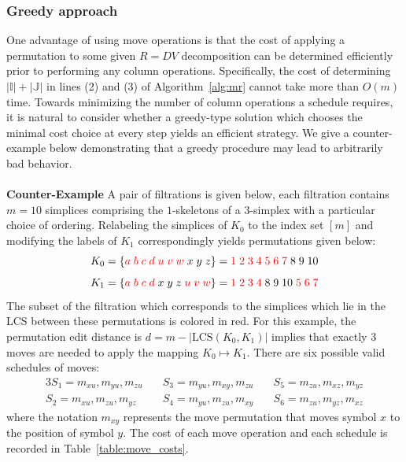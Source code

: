 \documentclass{article} %
\begin{document}
\subsubsection{Greedy approach}\label{sec:greedy} 
One advantage of using move operations is that the cost of applying a permutation to some given $R = D V$ decomposition can be determined efficiently prior to performing any column operations. 
Specifically, the cost of determining $\lvert \mathbb{I}\rvert + \lvert \mathbb{J}\rvert$ in lines (2) and (3) of Algorithm~\ref{alg:mr} cannot take more than $O(m)$ time. 
Towards minimizing the number of column operations a schedule requires, it is natural to consider whether a greedy-type solution which chooses the minimal cost choice at every step yields an efficient strategy. We give a counter-example below demonstrating that a greedy procedure may lead to arbitrarily bad behavior. 
\\
\\
\textbf{Counter-Example} A pair of filtrations is given below, each filtration contains $m = 10$ simplices comprising the $1$-skeletons of a $3$-simplex with a particular choice of ordering. Relabeling the simplices of $K_0$ to the index set $[m]$ and modifying the labels of $K_1$ correspondingly yields permutations given below: 
$$ K_0 = \{ {\color{red} a \; b \; c \; d \; u \; v \; w} \; x \; y \; z  \} = { {\color{red} 1 \; 2 \; 3 \; 4 \; 5 \; 6 \; 7 } \; 8 \; 9 \; 10 } $$
$$ K_1 = \{ {\color{red} a \; b \; c \; d } \; x \; y \; z \; {\color{red} u \; v \; w } \}  = { {\color{red} 1 \; 2 \; 3 \; 4 } \;8 \; 9 \; 10 \; {\color{red} 5 \; 6 \; 7 } }$$
The subset of the filtration which corresponds to the simplices which lie in the LCS between these permutations is colored in red. For this example, the permutation edit distance is 
$d = m - |\mathrm{LCS}(K_0, K_1)|$ implies that exactly $3$ moves are needed to apply the mapping $K_0 \mapsto K_1$. There are six possible valid schedules of moves: 
\begin{alignat*}{3}
	S_1 = m_{x u}, m_{y u}, m_{z u} \quad & S_3 = m_{y u}, m_{x y}, m_{z u} \quad  & S_5 = m_{z u}, m_{x z}, m_{y z} \\
	S_2 = m_{x u}, m_{z u}, m_{y z} \quad  & S_4 = m_{y u}, m_{z u}, m_{x y} \quad  & S_6 = m_{z u}, m_{y z}, m_{x z} 
\end{alignat*}
where the notation $m_{x y}$ represents the move permutation that moves symbol $x$ to the position of symbol $y$. The cost of each  move operation and each schedule is recorded in Table~\ref{table:move_costs}.
\end{document}
